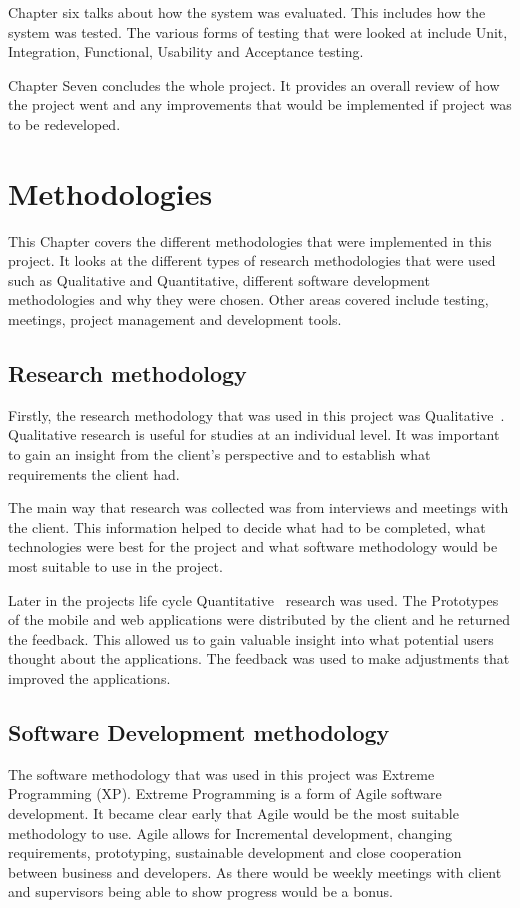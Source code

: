 Chapter six talks about how the system was evaluated. This includes how the system was tested. The various forms of testing that were looked at include Unit, Integration, Functional, Usability and Acceptance testing.

Chapter Seven concludes the whole project. It provides an overall review of how the project went and any improvements that would be implemented if project was to be redeveloped.




\chapter{Methodologies}
This Chapter covers the different methodologies that were implemented in this project. It looks at the different types of research methodologies that were used such as Qualitative and Quantitative, different software development methodologies and why they were chosen. Other areas covered include testing, meetings, project management and development tools.

\section{Research methodology}
Firstly, the research methodology that was used in this project was Qualitative~\cite{newman1998qualitative}. Qualitative research is useful for studies at an individual level. It was important to gain an insight from the client’s perspective and to establish what requirements the client had. 

The main way that research was collected was from interviews and meetings with the client. This information helped to decide what had to be completed, what technologies were best for the project and what software methodology would be most suitable to use in the project.

Later in the projects life cycle Quantitative~\cite{newman1998qualitative} research was used. The Prototypes of the mobile and web applications were distributed by the client and he returned the feedback. This allowed us to gain valuable insight into what potential users thought about the applications. The feedback was used to make adjustments that improved the applications.

\section{Software Development methodology}
The software methodology that was used in this project was Extreme Programming (XP). Extreme Programming is a form of Agile software development. It became clear early that Agile would be the most suitable methodology to use. Agile allows for Incremental development, changing requirements, prototyping, sustainable development and close cooperation between business and developers. As there would be weekly meetings with client and supervisors being able to show progress would be a bonus.

